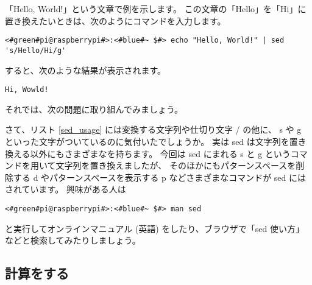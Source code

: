「Hello, World!」という文章で例を示します。
この文章の「Hello」を「Hi」に置き換えたいときは、次のようにコマンドを入力します。

\begin{lstlisting}[caption=sed コマンドを使った例, label=sed_app]
<#green#pi@raspberrypi#>:<#blue#~ $#> echo "Hello, World!" | sed 's/Hello/Hi/g'
\end{lstlisting}

すると、次のような結果が表示されます。

\begin{lstlisting}[caption=sed コマンドで変換した結果, label=sed_result]
Hi, Wowld!
\end{lstlisting}

それでは、次の問題に取り組んでみましょう。

\begin{tcolorbox}[title=\useOmetoi]
\begin{enumerate}
\end{enumerate}
\end{tcolorbox}

さて、リスト \ref{sed_usage} には変換する文字列や仕切り文字 / の他に、
s や g といった文字がついているのに気付いたでしょうか。
実は sed は文字列を置き換える以外にもさまざまなを持ちます。
今回は sed にまれる s と g というコマンドを用いて文字列を置き換えましたが、
そのほかにもパターンスペースを削除する d やパターンスペースを表示する p などさまざまなコマンドが sed にはされています。
興味がある人は

\begin{lstlisting}
<#green#pi@raspberrypi#>:<#blue#~ $#> man sed
\end{lstlisting}

と実行してオンラインマニュアル (英語) をしたり、ブラウザで「sed 使い方」などと検索してみたりしましょう。

\subsection{計算をする}

